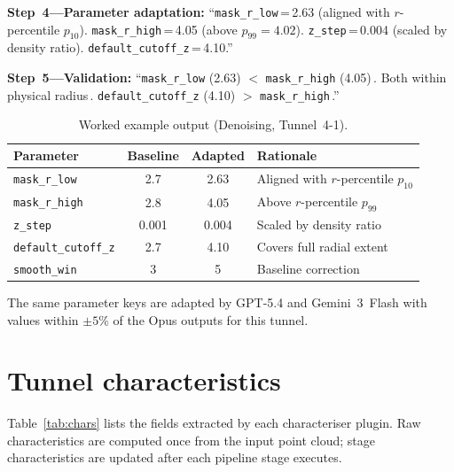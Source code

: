 \documentclass[a4paper,fleqn]{cas-dc}
\begin{document}
\textbf{Step~4---Parameter adaptation:}
``\texttt{mask\_r\_low}\,=\,2.63 (aligned with $r$-percentile $p_{10}$). \texttt{mask\_r\_high}\,=\,4.05 (above $p_{99} = 4.02$). \texttt{z\_step}\,=\,0.004 (scaled by density ratio). \texttt{default\_cutoff\_z}\,=\,4.10.''

\textbf{Step~5---Validation:}
``\texttt{mask\_r\_low} (2.63) $<$ \texttt{mask\_r\_high} (4.05)\,\checkmark. Both within physical radius\,\checkmark. \texttt{default\_cutoff\_z} (4.10) $>$ \texttt{mask\_r\_high}\,\checkmark.''

\begin{table}[ht]
\caption{Worked example output (Denoising, Tunnel~4-1).}\label{tab:cot-example}
\begin{tabular*}{\tblwidth}{@{} l c c l @{}}
\toprule
Parameter & Baseline & Adapted & Rationale \\
\midrule
\texttt{mask\_r\_low} & 2.7 & 2.63 & Aligned with $r$-percentile $p_{10}$ \\
\texttt{mask\_r\_high} & 2.8 & 4.05 & Above $r$-percentile $p_{99}$ \\
\texttt{z\_step} & 0.001 & 0.004 & Scaled by density ratio \\
\texttt{default\_cutoff\_z} & 2.7 & 4.10 & Covers full radial extent \\
\texttt{smooth\_win} & 3 & 5 & Baseline correction \\
\bottomrule
\end{tabular*}
\end{table}

The same parameter keys are adapted by GPT-5.4 and Gemini~3~Flash with values within $\pm 5$\% of the Opus outputs for this tunnel.

\section{Tunnel characteristics}\label{app:chars}

Table~\ref{tab:chars} lists the fields extracted by each characteriser plugin. Raw characteristics are computed once from the input point cloud; stage characteristics are updated after each pipeline stage executes.
\end{document}
